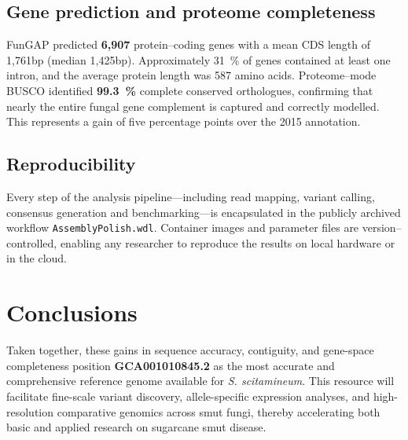 \documentclass[Journal,letterpaper]{ascelike-new}
\begin{document}
\subsection*{Gene prediction and proteome completeness}

FunGAP predicted \textbf{6,907} protein--coding genes with a mean CDS length of 1,761bp (median 1,425bp). Approximately 31~\% of genes contained at least one intron, and the average protein length was 587 amino acids. Proteome--mode BUSCO identified \textbf{99.3~\%} complete conserved orthologues, confirming that nearly the entire fungal gene complement is captured and correctly modelled. This represents a gain of five percentage points over the 2015 annotation.

\subsection*{Reproducibility}

Every step of the analysis pipeline—including read mapping, variant calling, consensus generation and benchmarking—is encapsulated in the publicly archived workflow \texttt{AssemblyPolish.wdl}. Container images and parameter files are version--controlled, enabling any researcher to reproduce the results on local hardware or in the cloud. 

\section*{Conclusions}

Taken together, these gains in sequence accuracy, contiguity, and gene-space completeness position \textbf{GCA001010845.2} as the most accurate and comprehensive reference genome available for \textit{S. scitamineum}. This resource will facilitate fine-scale variant discovery, allele-specific expression analyses, and high-resolution comparative genomics across smut fungi, thereby accelerating both basic and applied research on sugarcane smut disease.
\end{document}
